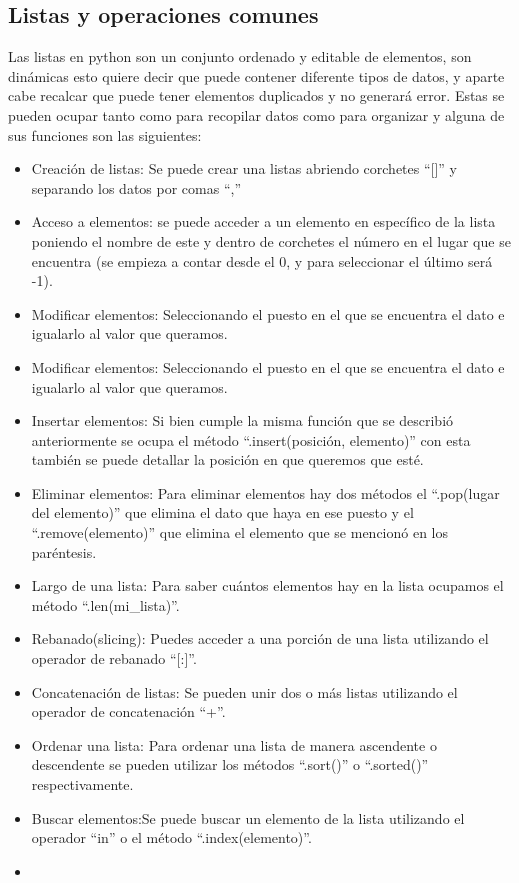 \subsection{Listas y operaciones comunes}
Las listas en python son un conjunto ordenado y editable de elementos, son dinámicas esto quiere decir que puede contener diferente tipos de datos, y aparte cabe recalcar que puede tener elementos duplicados y no generará error. Estas se pueden ocupar tanto como para recopilar datos como para organizar y alguna de sus funciones son las siguientes:

\begin{itemize}
    \item Creación de listas: Se puede crear una listas abriendo corchetes ``[]'' y separando los datos por comas ``,''
    \item Acceso a elementos: se puede acceder a un elemento en específico de la lista poniendo el nombre de este y dentro de corchetes el número en el lugar que se encuentra  (se empieza a contar desde el 0, y para seleccionar el último será -1).
    \item Modificar elementos: Seleccionando el puesto en el que se encuentra el dato e igualarlo al valor que queramos.
    \item Modificar elementos: Seleccionando el puesto en el que se encuentra el dato e igualarlo al valor que queramos.
    \item Insertar elementos: Si bien cumple la misma función que se describió anteriormente se ocupa el método ``.insert(posición, elemento)'' con esta también se puede detallar la posición en que queremos que esté.
    \item Eliminar elementos: Para eliminar elementos hay dos métodos el ``.pop(lugar del elemento)'' que elimina el dato que haya en ese puesto y el ``.remove(elemento)'' que elimina el elemento que se mencionó en los paréntesis.
    \item Largo de una lista: Para saber cuántos elementos hay en la lista ocupamos el método ``.len(mi\_lista)''.
    \item Rebanado(slicing): Puedes acceder a una porción de una lista utilizando el operador de rebanado ``[:]''.
    \item Concatenación de listas: Se pueden unir dos o más listas utilizando el operador de concatenación ``+''. 
    \item Ordenar una lista: Para ordenar una lista de manera ascendente o descendente se pueden utilizar los métodos ``.sort()'' o ``.sorted()'' respectivamente.
    \item Buscar elementos:Se puede buscar un elemento de la lista utilizando el operador “in” o el método ``.index(elemento)''.
    \item 
\end{itemize}

